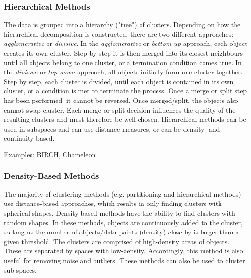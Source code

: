   \subsubsection{Hierarchical Methods}
  The data is grouped into a hierarchy ("tree") of clusters. Depending on how the hierarchical decomposition is constructed, there are two different approaches: \textit{agglomerative} or \textit{divisive}. In the \textit{agglomerative} or \textit{bottom-up} approach, each object creates its own cluster. Step by step it is then merged into its closest neighbours until all objects belong to one cluster, or a termination condition comes true. In the \textit{divisive} or \textit{top-down} approach, all objects initially form one cluster together. Step by step, each cluster is divided, until each object is contained in its own cluster, or a condition is met to terminate the process. Once a merge or split step has been performed, it cannot be reversed. Once merged/split, the objects also cannot swap cluster. Each merge or split decision influences the quality of the resulting clusters and must therefore be well chosen. Hierarchical methods can be used in subspaces and can use distance measures, or can be density- and continuity-based.


  Examples: BIRCH, Chameleon
  

  \subsubsection{Density-Based Methods}
  \label{section:densityBasedMethods}
  The majority of clustering methods (e.g. partitioning and hierarchical methods) use distance-based approaches, which results in only finding clusters with spherical shapes. Density-based methods have the ability to find clusters with random shapes. In these methods, objects are continuously added to the cluster, so long as the number of objects/data points (density) close by is larger than a given threshold. The clusters are comprised of high-density areas of objects. These are separated by spaces with low-density. Accordingly, this method is also useful for removing noise and outliers.
  These methods can also be used to cluster sub spaces.

